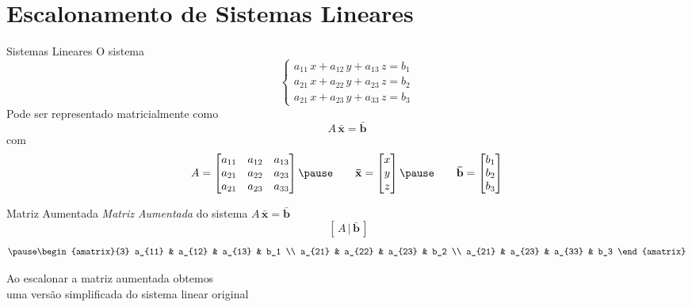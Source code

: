 \documentclass[fleqn,aspectratio=169,12pt]{beamer}
\begin{document}




\section{Escalonamento de Sistemas Lineares}

\begin{frame}{Sistemas Lineares}
  O sistema
  \[
    \begin{cases}
      a_{11} \, x + a_{12} \, y + a_{13} \, z = b_1 \\
      a_{21} \, x + a_{22} \, y + a_{23} \, z = b_2 \\
      a_{21} \, x + a_{23} \, y + a_{33} \, z = b_3
    \end{cases}
  \]
  \pause
  Pode ser representado matricialmente como
  \[
    A\,\mathbf{\bar{x}} = \mathbf{\bar{b}}
  \]
  \pause
  com
  \[
    A =
    \begin{bmatrix}
      a_{11} & a_{12} & a_{13} \\
      a_{21} & a_{22} & a_{23} \\
      a_{21} & a_{23} & a_{33}
    \end{bmatrix}
    \pause
    \qquad
    \mathbf{\bar{x}} =
    \begin{bmatrix}
      x \\ y \\ z
    \end{bmatrix}
    \pause
    \qquad
    \mathbf{\bar{b}} =
    \begin{bmatrix}
      b_1 \\ b_2 \\ b_3
    \end{bmatrix}
  \]
\end{frame}

\begin{frame}{Matriz Aumentada}
  \emph{Matriz Aumentada} do sistema \(A\,\mathbf{\bar{x}} = \mathbf{\bar{b}}\)
  \pause
  \[
    \; \left[
      \, A \, | \, \mathbf{\bar{b}} \,
    \right]
  \]
  \[
    \pause
    \begin{amatrix}{3}
      a_{11} & a_{12} & a_{13} & b_1 \\
      a_{21} & a_{22} & a_{23} & b_2 \\
      a_{21} & a_{23} & a_{33} & b_3
    \end{amatrix}
  \]

  \pause
  \medskip
  Ao escalonar a matriz aumentada obtemos \\
  uma versão simplificada do sistema linear original
\end{frame}
\end{document}
